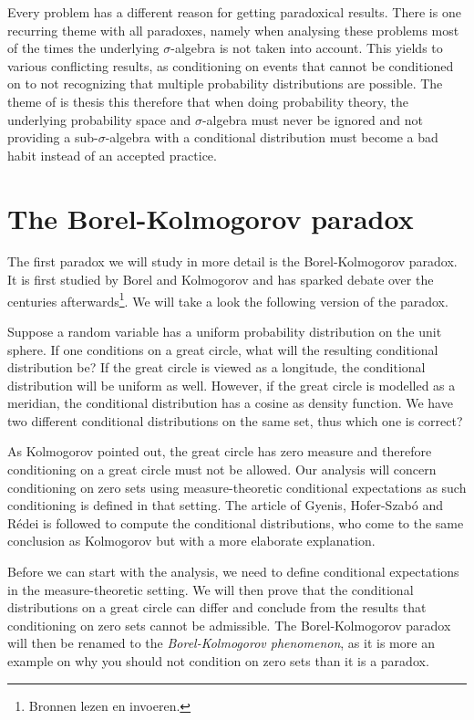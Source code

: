 \documentclass[twoside,a4paper]{report}
\theoremstyle{plain}
\theoremstyle{definition}
\theoremstyle{remark}
\numberwithin{equation}{chapter}
\DeclareMathOperator{\1}{\mathbbm{1}}
\begin{document}
Every problem has a different reason for getting paradoxical results. There is one recurring theme with all paradoxes, namely when analysing these problems most of the times the underlying $\sigma$-algebra is not taken into account. This yields to various conflicting results, as conditioning on events that cannot be conditioned on to not recognizing that multiple probability distributions are possible. The theme of is thesis this therefore that when doing probability theory, the underlying probability space and $\sigma$-algebra must never be ignored and not providing a sub-$\sigma$-algebra with a conditional distribution must become a bad habit instead of an accepted practice.



\chapter{The Borel-Kolmogorov paradox}\label{chap:BorelKolmogorov}
The first paradox we will study in more detail is the Borel-Kolmogorov paradox. It is first studied by Borel \cite{Borel09} and Kolmogorov \cite{Kolmogorov33} and has sparked debate over the centuries afterwards\footnote{Bronnen lezen en invoeren.}. We will take a look the following version of the paradox.

Suppose a random variable has a uniform probability distribution on the unit sphere. If one conditions on a great circle, what will the resulting conditional distribution be? If the great circle is viewed as a longitude, the conditional distribution will be uniform as well. However, if the great circle is modelled as a meridian, the conditional distribution has a cosine as density function. We have two different conditional distributions on the same set, thus which one is correct?

As Kolmogorov \cite{Kolmogorov33} pointed out, the great circle has zero measure and therefore conditioning on a great circle must not be allowed. Our analysis will concern conditioning on zero sets using measure-theoretic conditional expectations as such conditioning is defined in that setting. The article of Gyenis, Hofer-Szabó and Rédei \cite{Gyenis17} is followed to compute the conditional distributions, who come to the same conclusion as Kolmogorov but with a more elaborate explanation.

Before we can start with the analysis, we need to define conditional expectations in the measure-theoretic setting. We will then prove that the conditional distributions on a great circle can differ and conclude from the results that conditioning on zero sets cannot be admissible. The Borel-Kolmogorov paradox will then be renamed to the \emph{Borel-Kolmogorov phenomenon}, as it is more an example on why you should not condition on zero sets than it is a paradox.
\end{document}
